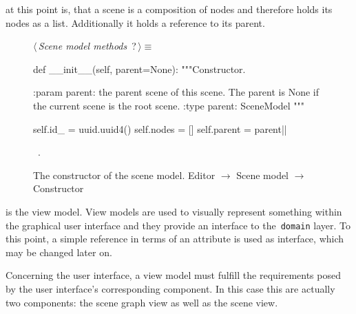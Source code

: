 \documentclass[%
    a4paper,    %
    justified,  %
    nobib,      %
    openany     %
]{tufte-book}
\begin{document}
 at this point is, that a scene is a composition
of nodes and therefore holds its nodes as a list. Additionally it holds a
reference to its parent.

\begin{figure}
\begin{flushleft} \small
\begin{minipage}{\linewidth}\label{scrap22}\raggedright\small
{} $\langle\,${\itshape Scene model methods}\nobreak\ {\footnotesize {?}}$\,\rangle\equiv$
\vspace{-1ex}
\begin{pythoncode}
def __init__(self, parent=None):
    """Constructor.

    :param parent: the parent scene of this scene. The parent is
                   None if the current scene is the root scene.
    :type parent:  SceneModel
    """

    self.id_ = uuid.uuid4()
    self.nodes = []
    self.parent = parent|\NWsep|
\end{pythoncode}
\vspace{1.5ex}
\footnotesize
\begin{list}{}{\setlength{\itemsep}{-\parsep}\setlength{\itemindent}{-\leftmargin}}
\item \NWtxtMacroRefIn\ .

\item{}
\end{list}
\end{minipage}\vspace{4ex}
\end{flushleft}
\caption{The constructor of the scene model.
  \newline{}\newline{}Editor $\rightarrow$ Scene model $\rightarrow$ Constructor}
\label{editor:lst:scene-model:constructor}
\end{figure}

 is the view model. View models
are used to visually represent something within the graphical user interface and
they provide an interface to the~\verb=domain= layer. To this point, a simple
reference in terms of an attribute is used as interface, which may be changed
later on.

Concerning the user interface, a view model must fulfill the requirements posed
by the user interface's corresponding component. In this case this are actually
two components: the scene graph view as well as the scene view.
\end{document}
